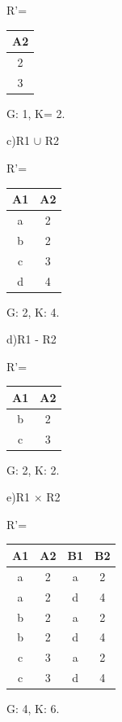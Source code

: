 \documentclass[fleqn]{article}
\begin{document}
\begin{center}
    R'=\begin{tabular}{|c|}
        \hline
        A2\\
        \hline
        2\\
        3\\
        \hline
    \end{tabular}

    G: 1, K= 2.
\end{center}

c)R1 $\cup$ R2

\begin{center}
    R'=\begin{tabular}{|c|c|}
        \hline
        A1&A2\\
        \hline
        a&2\\
        b&2\\
        c&3\\
        d&4\\
        \hline
    \end{tabular}

    G: 2, K: 4.
\end{center}

d)R1 - R2

\begin{center}
    R'=\begin{tabular}{|c|c|}
        \hline
        A1&A2\\
        \hline
        b&2\\
        c&3\\
        \hline
    \end{tabular}

    G: 2, K: 2.
\end{center}

e)R1 $\times$ R2

\begin{center}
    R'=\begin{tabular}{|c|c|c|c|}
        \hline
        A1&A2&B1&B2\\
        \hline
        a&2&a&2\\
        a&2&d&4\\
        b&2&a&2\\
        b&2&d&4\\
        c&3&a&2\\
        c&3&d&4\\
        \hline
    \end{tabular}

    G: 4, K: 6.
\end{center}
\end{document}
